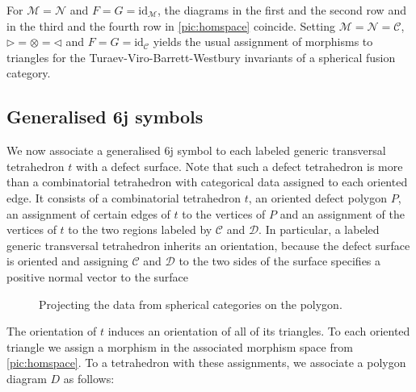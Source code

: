\documentclass[1.5pt, a4paper]{article}
\newcommand{\mac}{\mathcal C}
\newcommand{\mad}{\mathcal D}
\newcommand{\mam}{\mathcal M}
\newcommand{\man}{\mathcal N}
\newcommand{\oo}[0]{\otimes}
\newcommand{\id}[0]{\mathrm{id}}
\begin{document}
For $\mam=\man$ and $F=G=\id_\mam$,  the diagrams in the first and the second row and in the third and the fourth row in \eqref{pic:homspace} coincide. Setting $\mam=\man=\mac$, $\rhd=\oo=\lhd$ and $F=G=\id_\mac$  yields the usual assignment of morphisms to triangles for the Turaev-Viro-Barrett-Westbury invariants of a spherical fusion category.



\subsection{Generalised 6j symbols}

We now associate a generalised 6j symbol to each  labeled generic  transversal tetrahedron $t$ with a defect surface. Note that such a defect tetrahedron  is more than a combinatorial tetrahedron with categorical data assigned to each oriented edge. It consists of a combinatorial tetrahedron $t$, an oriented defect polygon $P$,  an assignment of certain edges of $t$ to the vertices  of $P$ and an assignment of the vertices of $t$ to the two regions labeled by $\mac$ and $\mad$. 
  In particular,  a labeled generic  transversal tetrahedron inherits an orientation, because the defect surface is oriented and assigning $\mac$ and $\mad$ to the two sides of the surface specifies a positive normal vector to the surface
  
  \begin{figure} 
\centering
\def\svgwidth{.85\columnwidth}

\caption{Projecting the data from spherical categories on the polygon.}
\label{fig:projecting}
\end{figure}
  
   The orientation of $t$ induces an orientation of all of its triangles. To each oriented triangle we assign a morphism in the associated morphism space from \eqref{pic:homspace}. 
To a tetrahedron with these assignments, we  associate a polygon diagram $D$ as follows:
\end{document}
